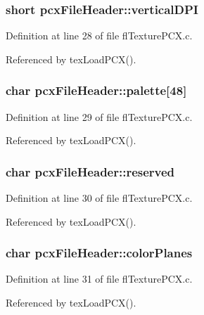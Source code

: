 \subsubsection{\setlength{\rightskip}{0pt plus 5cm}short {\bf pcx\-File\-Header::vertical\-DPI}}\label{structpcxFileHeader_9b1a862bfa9008d6b413240da0ce9dc3}




Definition at line 28 of file fl\-Texture\-PCX.c.

Referenced by tex\-Load\-PCX().
\subsubsection{\setlength{\rightskip}{0pt plus 5cm}char {\bf pcx\-File\-Header::palette}[48]}\label{structpcxFileHeader_5cb08f052b40f61c6f79fcca379889f1}




Definition at line 29 of file fl\-Texture\-PCX.c.

Referenced by tex\-Load\-PCX().
\subsubsection{\setlength{\rightskip}{0pt plus 5cm}char {\bf pcx\-File\-Header::reserved}}\label{structpcxFileHeader_28483a4bc2867a9dc2e49a748b4920a4}




Definition at line 30 of file fl\-Texture\-PCX.c.

Referenced by tex\-Load\-PCX().
\subsubsection{\setlength{\rightskip}{0pt plus 5cm}char {\bf pcx\-File\-Header::color\-Planes}}\label{structpcxFileHeader_e11610c28a3073b59532ac847f7472ca}




Definition at line 31 of file fl\-Texture\-PCX.c.

Referenced by tex\-Load\-PCX().
